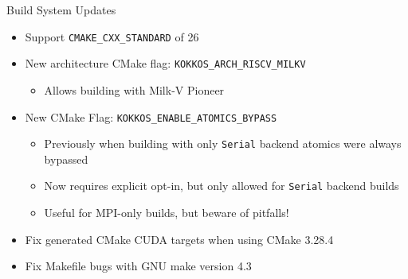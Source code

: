 


\begin{frame}[fragile]{Build System Updates}
\begin{itemize}
  \item Support \texttt{CMAKE\_CXX\_STANDARD} of 26
  \item New architecture CMake flag: \texttt{KOKKOS\_ARCH\_RISCV\_MILKV}
  \begin{itemize}
    \item Allows building with Milk-V Pioneer
  \end{itemize}
  \item New CMake Flag: \texttt{KOKKOS\_ENABLE\_ATOMICS\_BYPASS}
  \begin{itemize}
    \item Previously when building with only \texttt{Serial} backend atomics were always bypassed
    \item Now requires explicit opt-in, but only allowed for \texttt{Serial} backend builds
    \item Useful for MPI-only builds, but beware of pitfalls!
  \end{itemize}
  \item Fix generated CMake CUDA targets when using CMake 3.28.4
  \item Fix Makefile bugs with GNU make version 4.3
\end{itemize}
\end{frame}


